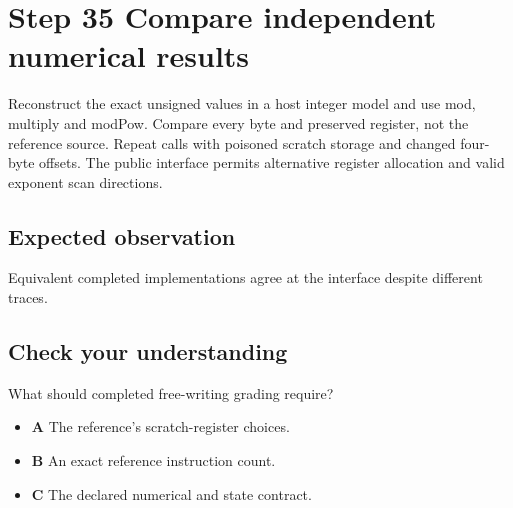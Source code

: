 \section{Step 35 Compare independent numerical results}\label{rsa-s35}

Reconstruct the exact unsigned values in a host integer model and use mod, multiply and modPow. Compare every byte and preserved register, not the reference source. Repeat calls with poisoned scratch storage and changed four-byte offsets. The public interface permits alternative register allocation and valid exponent scan directions.

\subsection{Expected observation}
Equivalent completed implementations agree at the interface despite different traces.

\subsection{Check your understanding}
What should completed free-writing grading require?

\begin{itemize}
  \item \textbf{A} The reference's scratch-register choices.
  \item \textbf{B} An exact reference instruction count.
  \item \textbf{C} The declared numerical and state contract.
\end{itemize}
